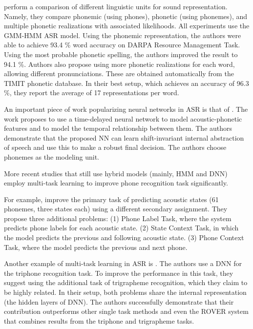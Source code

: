  perform a comparison of different linguistic units for sound representation. Namely, they compare phonemic (using phones), phonetic (using phonemes), and multiple phonetic realizations with associated likelihoods. All experiments use the GMM-HMM ASR model. Using the phonemic representation, the authors were able to achieve 93.4 \% word accuracy on DARPA Resource Management Task. Using the most probable phonetic spelling, the authors improved the result to 94.1 \%. Authors also propose using more phonetic realizations for each word, allowing different pronunciations. These are obtained automatically from the TIMIT phonetic database. In their best setup, which achieves an accuracy of 96.3 \%, they report the average of 17 representations per word.

An important piece of work popularizing neural networks in ASR is that of . The work proposes to use a time-delayed neural network to model acoustic-phonetic features and to model the temporal relationship between them. The authors demonstrate that the proposed NN can learn shift-invariant internal abstraction of speech and use this to make a robust final decision. The authors choose phonemes as the modeling unit.

More recent studies that still use hybrid models (mainly, HMM and DNN) employ multi-task learning to improve phone recognition task significantly. 

For example,  improve the primary task of predicting acoustic states (61 phonemes, three states each) using a different secondary assignment. They propose three additional problems: (1) Phone Label Task, where the system predicts phone labels for each acoustic state. (2) State Context Task, in which the model predicts the previous and following acoustic state. (3) Phone Context Task, where the model predicts the previous and next phone.

Another example of multi-task learning in ASR is . The authors use a DNN for the triphone recognition task. To improve the performance in this task, they suggest using the additional task of trigrapheme recognition, which they claim to be highly related. In their setup, both problems share the internal representation (the hidden layers of DNN). The authors successfully demonstrate that their contribution outperforms other single task methods and even the ROVER system  that combines results from the triphone and trigrapheme tasks.

